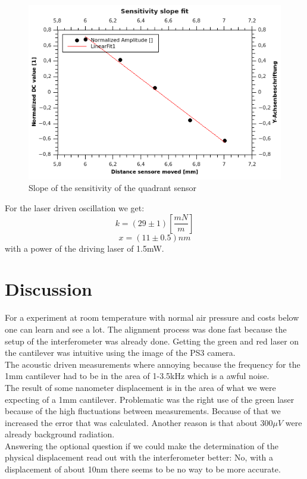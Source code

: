 \documentclass[12pt,a4paper]{article}
\begin{document}
\begin{multicols}{2}

\begin{figure}[H]
	\centering
	\includegraphics[scale=1.4]{../figures/Slopeofsensitivityofthesensor.png}
	\caption{Slope of the sensitivity of the quadrant sensor}
	\label{fig:sensorsensitivity}
\end{figure}

For the laser driven oscillation we get:
$$k = (29 \pm 1) [\frac{mN}{m}]$$
$$x = (11 \pm 0.5) nm$$
with a power of the driving laser of 1.5mW.


\section{Discussion}
For a experiment at room temperature with normal air pressure and costs below  one can learn and see a lot. The alignment process was done fast because the setup of the interferometer was already done. Getting the green and red laser on the cantilever was intuitive using the image of the PS3 camera. \\
The acoustic driven measurements where annoying because the frequency for the 1mm cantilever had to be in the area of 1-3.5kHz which is a awful noise.\\
The result of some nanometer displacement is in the area of what we were expecting of a 1mm cantilever. Problematic was the right use of the green laser because of the high fluctuations between measurements. Because of that we increased the error that was calculated. Another reason is that about 300$\mu V$ were already background radiation.\\

Answering the optional question if we could make the determination of the physical displacement read out with the interferometer better:
No, with a displacement of about 10nm there seems to be no way to be more accurate.






\end{multicols}
\end{document}
